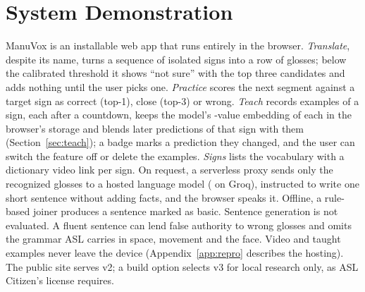 \section{System Demonstration}
\label{sec:system}

ManuVox is an installable web app that runs entirely in the browser. \emph{Translate}, despite its
name, turns a sequence of isolated signs into a row of glosses; below the calibrated threshold it
shows ``not sure'' with the top three candidates and adds nothing until the user picks one.
\emph{Practice} scores the next segment against a target sign as correct (top-1), close (top-3) or
wrong. \emph{Teach} records  examples of a sign, each after a countdown, keeps the
model's -value embedding of each in the browser's storage and blends later
predictions of that sign with them (Section~\ref{sec:teach}); a badge marks a prediction they
changed, and the user can switch the feature off or delete the examples. \emph{Signs} lists the
vocabulary with a dictionary video link per sign. On request, a serverless proxy sends only the
recognized glosses to a hosted language model ( on Groq), instructed to
write one short sentence without adding facts, and the browser speaks it. Offline, a rule-based
joiner produces a sentence marked as basic. Sentence generation is not evaluated. A fluent
sentence can lend false authority to wrong glosses and omits the grammar ASL carries in space,
movement and the face. Video and taught examples never leave the device (Appendix~\ref{app:repro}
describes the hosting). The public site serves v2; a build option selects v3 for local
research only, as ASL Citizen's license requires.
